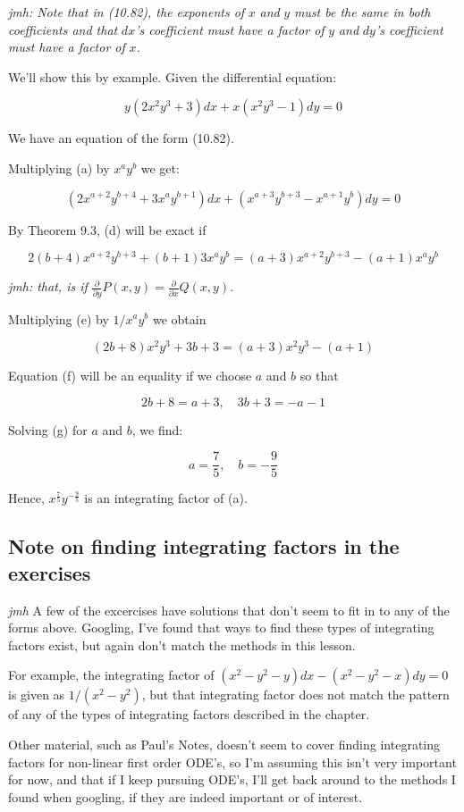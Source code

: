 \documentclass{article}
\begin{document}
\emph{jmh: Note that in (10.82), the exponents of} $x$ \emph{and} $y$ \emph{must be the same in both coefficients and that} $dx$\emph{'s coefficient must have a factor of} $y$ \emph{and} $dy$\emph{'s coefficient must have a factor of} $x$\emph{.}

We'll show this by example. Given the differential equation:

\[ \tag{a} y(2x^2y^3 +3)dx + x(x^2y^3 - 1)dy = 0 \]

We have an equation of the form (10.82).

Multiplying (a) by $x^ay^b$ we get:

\[ \tag{d} (2x^{a+2}y^{b+4}+3x^ay^{b+1})dx + (x^{a+3}y^{b+3} - x^{a+1}y^b)dy = 0 \]

By Theorem 9.3, (d) will be exact if

\[ \tag{e} 2(b+4)x^{a+2}y^{b+3} + (b+1)3x^ay^b = (a+3)x^{a+2}y^{b+3} - (a+1)x^ay^b \]

\emph{jmh: that, is if} $\frac{\partial}{\partial y}P(x,y) = \frac{\partial}{\partial x}Q(x,y)$.

Multiplying (e) by $1/x^ay^b$ we obtain

\[ \tag{f} (2b+8)x^2y^3 +3b + 3 = (a+3)x^2y^3 - (a+1) \]

Equation (f) will be an equality if we choose $a$ and $b$ so that

\[ \tag{g} 2b + 8 = a + 3,\quad 3b + 3 = -a - 1 \]

Solving (g) for $a$ and $b$, we find:

\[ \tag{h} a = \frac{7}{5},\quad b=-\frac{9}{5} \]

Hence, $x^{\frac{7}{5}}y^{-\frac{9}{5}}$ is an integrating factor of (a).

\subsection{Note on finding integrating factors in the exercises}
\emph{jmh} A few of the excercises have solutions that don't seem to fit in to any of the forms above. Googling, I've found that ways to find these types of integrating factors exist, but again don't match the methods in this lesson.

For example, the integrating factor of $(x^2 - y^2 - y)dx - (x^2 - y^2 -x)dy = 0$ is given as $1/(x^2 - y^2)$, but that integrating factor does not match the pattern of any of the types of integrating factors described in the chapter.

Other material, such as Paul's Notes, doesn't seem to cover finding integrating factors for non-linear first order ODE's, so I'm assuming this isn't very important for now, and that if I keep pursuing ODE's, I'll get back around to the methods I found when googling, if they are indeed important or of interest.
\end{document}
